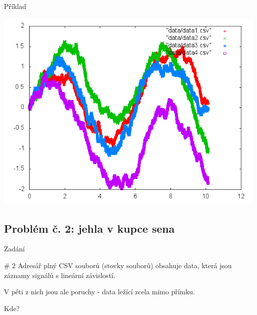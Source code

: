 \documentclass{beamer}
\begin{document}
\begin{frame}{Příklad}
  \begin{center}
      \includegraphics[width=0.6\columnwidth]{plot4}
      \end{center}
      
\end{frame}

\subsection{Problém č. 2: jehla v kupce sena}

\begin{frame}{Zadání}
  \begin{block}{\# 2}
    Adresář plný CSV souborů (stovky souborů) obsahuje data, která jsou záznamy signálů s lineární závislostí.
    
    V pěti z nich jsou ale poruchy - data ležící zcela mimo přímku.
    
    Kde?
  \end{block}
\end{frame}
\end{document}
